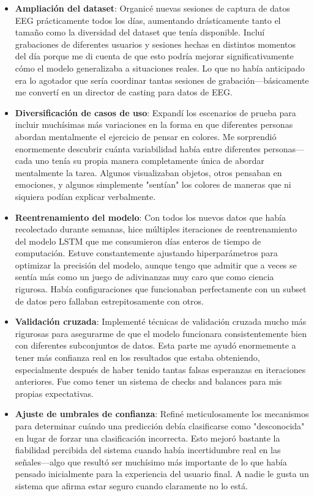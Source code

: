 \begin{itemize}
    \item \textbf{Ampliación del dataset}: Organicé nuevas sesiones de captura de datos EEG prácticamente todos los días, aumentando drásticamente tanto el tamaño como la diversidad del dataset que tenía disponible. Incluí grabaciones de diferentes usuarios y sesiones hechas en distintos momentos del día porque me di cuenta de que esto podría mejorar significativamente cómo el modelo generalizaba a situaciones reales. Lo que no había anticipado era lo agotador que sería coordinar tantas sesiones de grabación—básicamente me convertí en un director de casting para datos de EEG.
    
    \item \textbf{Diversificación de casos de uso}: Expandí los escenarios de prueba para incluir muchísimas más variaciones en la forma en que diferentes personas abordan mentalmente el ejercicio de pensar en colores. Me sorprendió enormemente descubrir cuánta variabilidad había entre diferentes personas—cada uno tenía su propia manera completamente única de abordar mentalmente la tarea. Algunos visualizaban objetos, otros pensaban en emociones, y algunos simplemente "sentían" los colores de maneras que ni siquiera podían explicar verbalmente.
    
    \item \textbf{Reentrenamiento del modelo}: Con todos los nuevos datos que había recolectado durante semanas, hice múltiples iteraciones de reentrenamiento del modelo LSTM que me consumieron días enteros de tiempo de computación. Estuve constantemente ajustando hiperparámetros para optimizar la precisión del modelo, aunque tengo que admitir que a veces se sentía más como un juego de adivinanzas muy caro que como ciencia rigurosa. Había configuraciones que funcionaban perfectamente con un subset de datos pero fallaban estrepitosamente con otros.
    
    \item \textbf{Validación cruzada}: Implementé técnicas de validación cruzada mucho más rigurosas para asegurarme de que el modelo funcionara consistentemente bien con diferentes subconjuntos de datos. Esta parte me ayudó enormemente a tener más confianza real en los resultados que estaba obteniendo, especialmente después de haber tenido tantas falsas esperanzas en iteraciones anteriores. Fue como tener un sistema de checks and balances para mis propias expectativas.
    
    \item \textbf{Ajuste de umbrales de confianza}: Refiné meticulosamente los mecanismos para determinar cuándo una predicción debía clasificarse como "desconocida" en lugar de forzar una clasificación incorrecta. Esto mejoró bastante la fiabilidad percibida del sistema cuando había incertidumbre real en las señales—algo que resultó ser muchísimo más importante de lo que había pensado inicialmente para la experiencia del usuario final. A nadie le gusta un sistema que afirma estar seguro cuando claramente no lo está.
\end{itemize}

